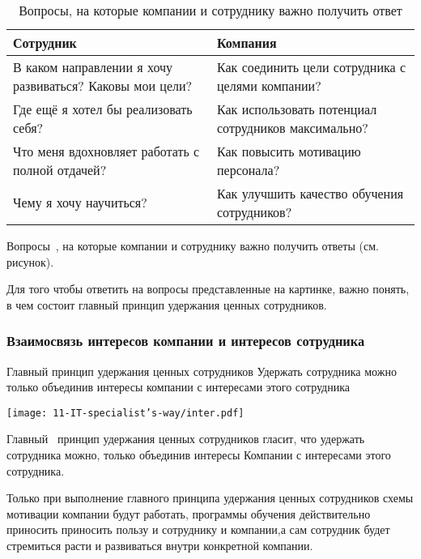 \documentclass{../industrial-development}
\begin{document}
\begin{frame} \frametitle{}


 \begin{table}[H]
\caption{\label{tab:canonsummary} Вопросы, на которые компании и сотруднику важно получить ответ }
\begin{center}
\begin{tabular}{|p{0.5\linewidth}|p{0.5\linewidth}|}
\hline
\textbf{Сотрудник} & \textbf{Компания} \\
\hline
В каком направлении я хочу развиваться? Каковы мои цели? &  Как соединить цели сотрудника с целями компании? \\
\hline
Где ещё я хотел бы реализовать себя?  & Как использовать потенциал сотрудников максимально? \\
\hline
Что меня вдохновляет работать с полной отдачей? & Как повысить мотивацию персонала? \\
\hline
Чему я хочу научиться? & Как улучшить качество обучения сотрудников? \\
\hline
\end{tabular}
\end{center}
\end{table} 

\end{frame}


\lecturenotes

Вопросы~\cite{IPl}, на которые компании и сотруднику важно получить ответы (см. рисунок).

Для того чтобы ответить на вопросы представленные на картинке, важно понять, в чем состоит главный принцип удержания ценных сотрудников.


\begin{frame} \frametitle{Взаимосвязь интересов компании и интересов сотрудника}
  \begin{block}{Главный принцип удержания ценных сотрудников}
Удержать сотрудника можно только объединив интересы компании с интересами этого сотрудника
  \end{block}
  \centerline{\texttt{[image: 11-IT-specialist's-way/inter.pdf]}}
\end{frame}

\lecturenotes

Главный~\cite{IPl} принцип удержания ценных сотрудников гласит, что удержать сотрудника можно, только объединив интересы Компании с интересами этого сотрудника.

Только при выполнение главного принципа удержания ценных сотрудников схемы мотивации компании будут работать, программы обучения действительно приносить приносить пользу и сотруднику и компании,а сам сотрудник будет стремиться расти и развиваться внутри конкретной компании.
\end{document}
